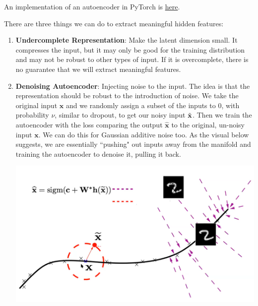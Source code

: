 \documentclass{article}
\begin{document}
  \begin{algo}
    An implementation of an autoencoder in PyTorch is \href{code/autoencoder.html}{here}. 
  \end{algo}

  There are three things we can do to extract meaningful hidden features: 
  \begin{enumerate}
    \item \textbf{Undercomplete Representation}: Make the latent dimension small. It compresses the input, but it may only be good for the training distribution and may not be robust to other types of input. If it is overcomplete, there is no guarantee that we will extract meaningful features. 

    \item \textbf{Denoising Autoencoder}: Injecting noise to the input. The idea is that the representation should be robust to the introduction of noise. We take the original input $\mathbf{x}$ and we randomly assign a subset of the inputs to $0$, with probability $\nu$, similar to dropout, to get our noisy input $\Tilde{\mathbf{x}}$. Then we train the autoencoder with the loss comparing the output $\hat{\mathbf{x}}$ to the original, un-noisy input $\mathbf{x}$. We can do this for Gaussian additive noise too. As the visual below suggests, we are essentially ``pushing" out inputs away from the manifold and training the autoencoder to denoise it, pulling it back. 

      \begin{center}
          \includegraphics[scale=0.3]{img/denoising_autoencoder.png}
      \end{center}
  

\end{enumerate}
\end{document}
